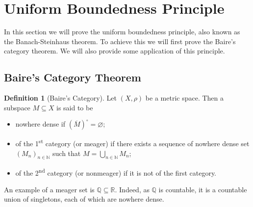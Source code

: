 \documentclass[]{article}
\theoremstyle{definition}
\theoremstyle{definition}
\newtheorem{definition}{Definition}[section]
\begin{document}
\newpage
\section{Uniform Boundedness Principle}

In this section we will prove the uniform boundedness principle, also 
known as the Banach-Steinhaus theorem. To achieve this we will first prove 
the Baire's category theorem. We will also provide some application of this 
principle.

\subsection{Baire's Category Theorem}

\begin{definition}[Baire's Category]
  Let \((X, \rho)\) be a metric space. Then a subspace \(M \subseteq X\) is 
  said to be 
  \begin{itemize}
    \item nowhere dense if \((\overline{M})^\circ = \varnothing\);
    \item of the 1\textsuperscript{st} category (or meager) if there exists 
      a sequence of nowhere dense set \((M_n)_{n \in \mathbb{N}}\) such that
      \(M = \bigcup_{n \in \mathbb{N}} M_n\);
    \item of the 2\textsuperscript{nd} category (or nonmeager) if it is 
      not of the first category.
  \end{itemize}
\end{definition}

An example of a meager set is \(\mathbb{Q} \subseteq \mathbb{R}\). Indeed, as 
\(\mathbb{Q}\) is countable, it is a countable union of singletons, each of 
which are nowhere dense.
\end{document}
